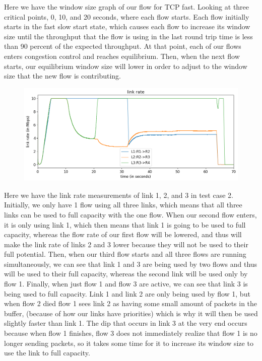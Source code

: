\documentclass{article}
\begin{document}
Here we have the window size graph of our flow for TCP fast. Looking at three critical points, 0, 10, and 20 seconds, where each flow starts. Each flow initially starts in the fast slow start state, which causes each flow to increase its window size until the throughput that the flow is using in the last round trip time is less than 90 percent of the expected throughput. At that point, each of our flows enters congestion control and reaches equilibrium. Then, when the next flow starts, our equilibrium window size will lower in order to adjust to the window size that the new flow is contributing.

\begin{figure}[H]
\centering
\includegraphics[width = \textwidth]{"test_case2_fast link rate"}
\end{figure}

Here we have the link rate measurements of link 1, 2, and 3 in test case 2. Initially, we only have 1 flow using all three links, which means that all three links can be used to full capacity with the one flow. When our second flow enters, it is only using link 1, which then means that link 1 is going to be used to full capacity, whereas the flow rate of our first flow will be lowered, and thus will make the link rate of links 2 and 3 lower because they will not be used to their full potential. Then, when our third flow starts and all three flows are running simultaneously, we can see that link 1 and 3 are being used by two flows and thus will be used to their full capacity, whereas the second link will be used only by flow 1. Finally, when just flow 1 and flow 3 are active, we can see that link 3 is being used to full capacity. Link 1 and link 2 are only being used by flow 1, but when flow 2 died flow 1 sees link 2 as having some small amount of packets in the buffer, (because of how our links have priorities) which is why it will then be used slightly faster than link 1. The dip that occurs in link 3 at the very end occurs because when flow 1 finishes, flow 3 does not immediately realize that flow 1 is no longer sending packets, so it takes some time for it to increase its window size to use the link to full capacity.
\end{document}
